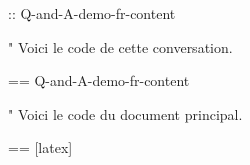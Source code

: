 \documentclass[%
  scroll,
]{Q-and-A}
\begin{document}
:: {Q-and-A-demo-fr-content}


"
  Voici le code de cette conversation.

  == {Q-and-A-demo-fr-content}

"
  Voici le code du document principal.

  == [latex] {\jobname}
\end{document}

